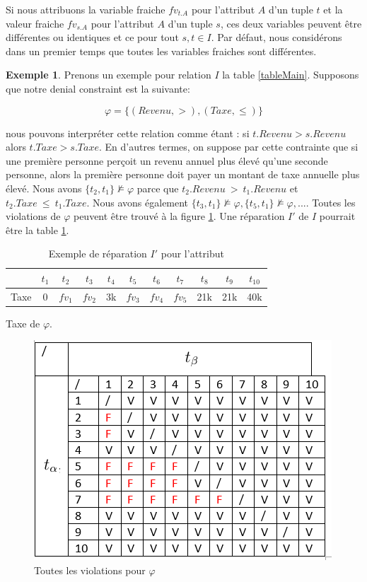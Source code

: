 \documentclass[letterpaper, 12pt]{report}
\theoremstyle{definition}
\newtheorem{myexample}{Exemple}
\begin{document}
Si nous attribuons la variable fraiche $fv_{t.A}$ pour l'attribut $A$ d'un tuple $t$ et la valeur fraiche $fv_{s.A}$ pour l'attribut $A$ d'un tuple $s$, ces deux variables peuvent être différentes ou identiques et ce pour tout $s,t \in I$. Par défaut, nous considérons dans un premier temps que toutes les variables fraiches sont différentes.\\

\begin{myexample}
Prenons un exemple pour relation $I$ la table \ref{tableMain}. Supposons que notre denial constraint est la suivante:

$$ \varphi = \{(Revenu,>),(Taxe,\leq)\}$$

nous pouvons interpréter cette relation comme étant : si $t.Revenu > s.Revenu$ alors $t.Taxe > s.Taxe$. En d'autres termes, on suppose par cette contrainte que si une première personne perçoit un revenu annuel plus élevé qu'une seconde personne, alors la première personne doit payer un montant de taxe annuelle plus élevé. Nous avons $\{t_2,t_1\} \not\models \varphi$ parce que $t_2.Revenu\ >\ t_1.Revenu$ et $t_2.Taxe\ \leq\ t_1.Taxe$. Nous avons également $\{t_3,t_1\} \not\models \varphi,\{t_5,t_1\} \not\models \varphi,...$. Toutes les violations de $\varphi$ peuvent être trouvé à la figure \ref{BadTax}. Une réparation $I'$ de $I$ pourrait être la table \ref{tableExample}.


\begin{table}[H]
	\centering
	\begin{tabular}{|c|c c c c c c c c c c|}
	\hline
	   & $t_1$ & $t_2$ & $t_3$ &$t_4$ &$t_5$ &$t_6$ &$t_7$ &$t_8$ &$t_9$ &$t_{10}$ \\
	\hline
	 Taxe & 0 & \color{red} $fv_1$ & \color{red} $fv_2$& 3k & \color{orange}$fv_3$& \color{orange} $fv_4$& \color{orange} $fv_5$& 21k & 21k & 40k\\
	 \hline
	\end{tabular}
	\caption{\label{tableExample} Exemple de réparation $I'$ pour l'attribut} 
	Taxe de $\varphi$.
\end{table}


\begin{figure}
	\centering
	\includegraphics[scale=1]{img/TaxBad}
	\caption{\label{BadTax} Toutes les violations pour $\varphi$}
\end{figure}


\end{myexample}
\end{document}
